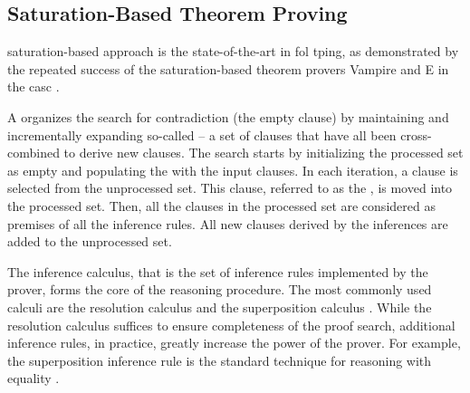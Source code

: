 \subsection{Saturation-Based Theorem Proving}

\Gls{saturation}-based approach is the state-of-the-art in \gls{fol} \gls{tping},
as demonstrated by the repeated success of the saturation-based theorem provers Vampire \cite{DBLP:conf/cav/KovacsV13} and E \cite{DBLP:conf/cade/0001CV19} in the \gls{casc} \cite{Sut16}.

A  organizes the search for contradiction
(the empty clause)
by maintaining and incrementally expanding so-called  -- a set of clauses that have all been cross-combined to derive new clauses.
The search starts by initializing the processed set as empty and populating the  with the input clauses.
In each iteration,
a clause is selected from the unprocessed set.
This clause, referred to as the , is moved into the processed set.
Then, all the clauses in the processed set are considered as premises of all the inference rules.
All new clauses derived by the inferences are added to the unprocessed set.


The inference calculus, that is the set of inference rules implemented by the prover, forms the core of the reasoning procedure.
The most commonly used calculi are the resolution calculus \cite{} and the superposition calculus \cite{}.
While the resolution calculus suffices to ensure completeness of the proof search,
additional inference rules, in practice, greatly increase the power of the prover.
For example, the superposition inference rule is the standard technique for reasoning with equality \cite{}.

